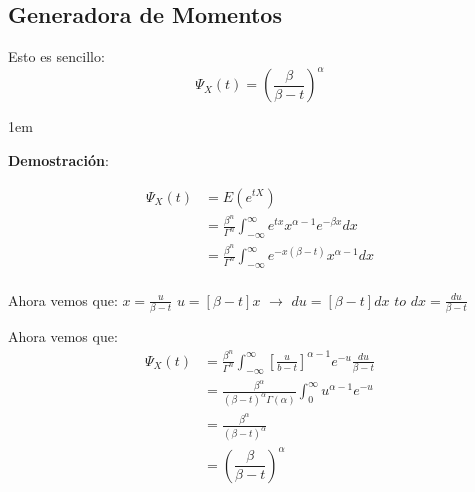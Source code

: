 \documentclass[12pt, fleqn]{report}                             %
\newenvironment{SmallIndentation}[1][0.75em]                    %
        {\begin{adjustwidth}{#1}{}\begin{footnotesize}}             %
        {\end{footnotesize}\end{adjustwidth}}                       %
\theoremstyle{break}                                            %
\newcommand{\Wrap}[1]           {\left( #1 \right)}             %
\newcommand{\Brackets}[1]       {\left[ #1 \right]}             %
\newcommand{\pfrac}[2]      {\Wrap{\dfrac{#1}{#2}}}             %
\begin{document}
            \clearpage
            \subsection{Generadora de Momentos}

                Esto es sencillo:
                \begin{equation*}
                    \Psi_X(t) = \pfrac{\beta}{\beta - t}^\alpha
                \end{equation*}

                \begin{SmallIndentation}[1em]
                    \textbf{Demostración}:
                    
                    \begin{align*}
                        \Psi_X(t)
                            &= E(e^{tX})        \\
                            &= \frac{\beta^n}{\Gamma^n} \int_{-\infty}^\infty e^{tx} x^{\alpha-1} e^{-\beta x} dx   \\
                            &= \frac{\beta^n}{\Gamma^n} \int_{-\infty}^\infty e^{-x(\beta - t)} x^{\alpha-1} dx     \\
                    \end{align*}

                    Ahora vemos que:
                    $x = \frac{u}{\beta - t}$ 
                            $u = [\beta - t]x$ $\to$ $du = [\beta - t]dx$ $to$ $dx = \frac{du}{\beta - t}$  

                    Ahora vemos que:
                    \begin{align*}
                        \Psi_X(t)
                            &= \frac{\beta^n}{\Gamma^n} \int_{-\infty}^\infty 
                                \Brackets{\frac{u}{b- t}}^{\alpha - 1} e^{-u} \frac{du}{\beta - t}                  \\
                            &= \frac{\beta^\alpha}{(\beta -t)^\alpha \Gamma(\alpha)} 
                                \int_0^\infty u^{\alpha - 1}e^{-u}                                                  \\
                            &= \frac{\beta^\alpha}{(\beta -t)^\alpha}                                               \\
                            &= \pfrac{\beta}{\beta - t}^\alpha
                    \end{align*}

                \end{SmallIndentation}
\end{document}
